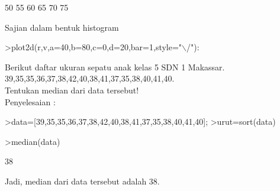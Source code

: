 \documentclass[12pt,arial,letterpaper]{book}
\begin{document}
\begin{eulercomment}
\begin{eulercomment}
\begin{eulercomment}
\begin{eulercomment}
\begin{eulercomment}
\begin{eulercomment}
\begin{eulercomment}
\begin{eulercomment}
\begin{eulercomment}
\begin{eulercomment}
\begin{eulercomment}
\begin{eulercomment}
\begin{eulercomment}
\begin{eulercomment}
\begin{eulercomment}
\begin{eulercomment}
\begin{eulercomment}
\begin{eulercomment}
\begin{eulercomment}
\begin{eulercomment}
\begin{eulercomment}
\begin{eulercomment}
\begin{eulercomment}
\begin{eulercomment}
\begin{eulercomment}
\begin{eulercomment}
\begin{eulercomment}
\begin{eulercomment}
\begin{eulercomment}
\begin{eulercomment}
\begin{eulercomment}
\begin{eulercomment}
\begin{eulercomment}
\begin{eulercomment}
\begin{eulercomment}
\begin{eulercomment}
\begin{eulercomment}
\begin{eulercomment}
\begin{euleroutput}
         50 
         55 
         60 
         65 
         70 
         75 
\end{euleroutput}
\begin{eulercomment}
Sajian dalam bentuk histogram
\end{eulercomment}
\begin{eulerprompt}
>plot2d(r,v,a=40,b=80,c=0,d=20,bar=1,style="\(\backslash\)/"):
\end{eulerprompt}
\begin{eulercomment}
Berikut daftar ukuran sepatu anak kelas 5 SDN 1 Makassar.\\
39,35,35,36,37,38,42,40,38,41,37,35,38,40,41,40.\\
Tentukan median dari data tersebut!\\
Penyelesaian :
\end{eulercomment}
\begin{eulerprompt}
>data=[39,35,35,36,37,38,42,40,38,41,37,35,38,40,41,40];
>urut=sort(data)
\end{eulerprompt}
\begin{euleroutput}
  [35,  35,  35,  36,  37,  37,  38,  38,  38,  39,  40,  40,  40,  41,
  41,  42]
\end{euleroutput}
\begin{eulerprompt}
>median(data)
\end{eulerprompt}
\begin{euleroutput}
  38
\end{euleroutput}
\begin{eulercomment}
Jadi, median dari data tersebut adalah 38.


\end{eulercomment}
\end{eulercomment}
\end{eulercomment}
\end{eulercomment}
\end{eulercomment}
\end{eulercomment}
\end{eulercomment}
\end{eulercomment}
\end{eulercomment}
\end{eulercomment}
\end{eulercomment}
\end{eulercomment}
\end{eulercomment}
\end{eulercomment}
\end{eulercomment}
\end{eulercomment}
\end{eulercomment}
\end{eulercomment}
\end{eulercomment}
\end{eulercomment}
\end{eulercomment}
\end{eulercomment}
\end{eulercomment}
\end{eulercomment}
\end{eulercomment}
\end{eulercomment}
\end{eulercomment}
\end{eulercomment}
\end{eulercomment}
\end{eulercomment}
\end{eulercomment}
\end{eulercomment}
\end{eulercomment}
\end{eulercomment}
\end{eulercomment}
\end{eulercomment}
\end{eulercomment}
\end{eulercomment}
\end{eulercomment}
\end{document}
